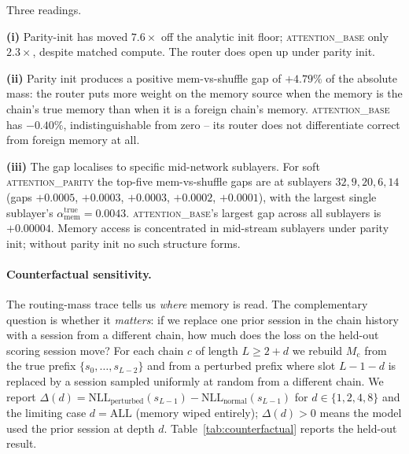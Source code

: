 \documentclass{article}
\newcommand{\Mc}{M_{\text{c}}}
\begin{document}
Three readings.

\textbf{(i)} Parity-init has moved $7.6\times$ off the analytic init
floor; \textsc{attention\_base} only $2.3\times$, despite matched
compute. The router does open up under parity init.

\textbf{(ii)} Parity init produces a positive mem-vs-shuffle gap of
$+4.79\%$ of the absolute mass: the router puts more weight on the
memory source when the memory is the chain's true memory than when it
is a foreign chain's memory. \textsc{attention\_base} has $-0.40\%$,
indistinguishable from zero -- its router does not differentiate
correct from foreign memory at all.

\textbf{(iii)} The gap localises to specific mid-network sublayers.
For soft \textsc{attention\_parity} the top-five mem-vs-shuffle gaps
are at sublayers $32, 9, 20, 6, 14$ (gaps $+0.0005$, $+0.0003$,
$+0.0003$, $+0.0002$, $+0.0001$), with the largest single sublayer's
$\alpha_{\text{mem}}^{\text{true}} = 0.0043$. \textsc{attention\_base}'s
largest gap across all sublayers is $+0.00004$. Memory access is
concentrated in mid-stream sublayers under parity init; without parity
init no such structure forms.

\paragraph{Counterfactual sensitivity.}
The routing-mass trace tells us \emph{where} memory is read. The
complementary question is whether it \emph{matters}: if we replace one
prior session in the chain history with a session from a different
chain, how much does the loss on the held-out scoring session move?
For each chain $c$ of length $L \geq 2 + d$ we rebuild $\Mc$ from the
true prefix $\{s_0, \dots, s_{L-2}\}$ and from a perturbed prefix
where slot $L-1-d$ is replaced by a session sampled uniformly at
random from a different chain. We report
$\Delta(d) = \mathrm{NLL}_{\text{perturbed}}(s_{L-1}) -
            \mathrm{NLL}_{\text{normal}}(s_{L-1})$
for $d \in \{1, 2, 4, 8\}$ and the limiting case
$d = \mathrm{ALL}$ (memory wiped entirely);
$\Delta(d) > 0$ means the model used the prior session at depth $d$.
Table~\ref{tab:counterfactual} reports the held-out result.
\end{document}
